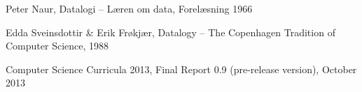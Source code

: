 \documentclass{article}
\begin{document}
\newpage
\begin{thebibliography}{9}
        Peter Naur,
        Datalogi -- Læren om data,
        Forelæsning 1966

        Edda Sveinsdottir \& Erik Frøkjær,
        Datalogy -- The Copenhagen Tradition of Computer Science,
        1988

        Computer Science Curricula 2013,
        Final Report 0.9 (pre-release version),
        October 2013
\end{thebibliography}
\end{document}
